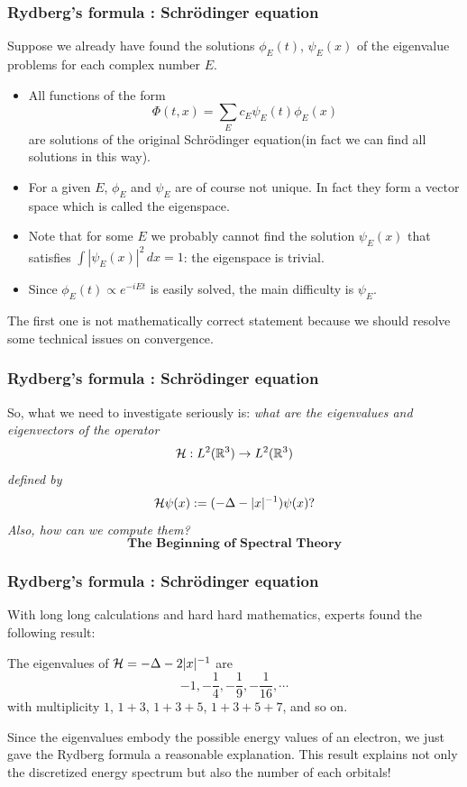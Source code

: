 \documentclass{beamer}
\begin{document}
\begin{frame}
\frametitle{Rydberg's formula : Schr\"odinger equation}
  Suppose we already have found the solutions $\phi_E(t)$, $\psi_E(x)$ of the eigenvalue problems for each complex number $E$.\pause
  \begin{itemize}[<+->]
    \item All functions of the form \[\Phi(t,x)=\sum_Ec_E\psi_E(t)\phi_E(x)\] are solutions of the original Schr\"odinger equation(in fact we can find all solutions in this way).
    \item For a given $E$, $\phi_E$ and $\psi_E$ are of course not unique. In fact they form a vector space which is called the eigenspace.
    \item Note that for some $E$ we probably cannot find the solution $\psi_E(x)$ that satisfies $\int|\psi_E(x)|^2\,dx=1$: the eigenspace is trivial.
    \item Since $\phi_E(t)\propto e^{-iEt}$ is easily solved, the main difficulty is $\psi_E$.
  \end{itemize}
  \begin{rmk}
    The first one is not mathematically correct statement because we should resolve some technical issues on convergence.
  \end{rmk}
\end{frame}

\begin{frame}
\frametitle{Rydberg's formula : Schr\"odinger equation}
  So, what we need to investigate seriously is:
  \pause\emph{what are the eigenvalues and eigenvectors of the operator}
  \[\cH:L^2(\R^3)\to L^2(\R^3)\]
  \emph{defined by}
  \[\mathcal{H}\psi(x):=(-\Delta-|x|^{-1})\psi(x)?\]
  \emph{Also, how can we compute them?}
  \pause \[\textbf{The Beginning of Spectral Theory}\]
\end{frame}

\begin{frame}
\frametitle{Rydberg's formula : Schr\"odinger equation}
  With long long calculations and hard hard mathematics, experts found the following result:
  \begin{prop}
    The eigenvalues of $\mathcal{H}=-\Delta-2|x|^{-1}$ are
    \[-1,-\frac14,-\frac19,-\frac1{16},\cdots\]
    \pause with multiplicity $1$, $1+3$, $1+3+5$, $1+3+5+7$, and so on.
  \end{prop}
  \pause Since the eigenvalues embody the possible energy values of an electron, we just gave the Rydberg formula a reasonable explanation.
  \pause This result explains not only the discretized energy spectrum but also the number of each orbitals!
\end{frame}
\end{document}
